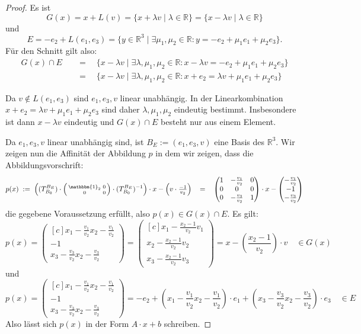 \documentclass{article}
\newcommand{\RR}{\mathbb{R}}
\newcommand{\eq}{\mathbb{\quad = \quad}}
\newcommand{\vect}[1]{\begin{pmatrix*}[c] #1 \end{pmatrix*}}
\begin{document}
\begin{proof}
  Es ist $$G(x) = x + L(v) = \{ x + \lambda v  \;|\;  \lambda \in \RR \}= \{ x - \lambda v  \;|\;  \lambda \in \RR \}$$
  und $$E = -e_2 + L(e_1, e_3) = \{y \in \RR^3  \;|\; \exists\mu_1, \mu_2 \in \RR: y = -e_2 + \mu_1 e_1 + \mu_2 e_3\}.$$
  Für den Schnitt gilt also:
\begin{align*}
    G(x) \cap E
    &\eq \{x - \lambda v  \;|\; \exists \lambda, \mu_1, \mu_2 \in \RR: x - \lambda v = -e_2 + \mu_1 e_1 + \mu_2 e_3\} \\
    &\eq \{x - \lambda v  \;|\; \exists \lambda, \mu_1, \mu_2 \in \RR: x + e_2 = \lambda v + \mu_1 e_1 + \mu_2 e_3\}
\end{align*}

Da $v \notin L(e_1,e_3)$ sind $e_1, e_3, v$ linear unabhängig.
In der Linearkombination $x + e_2 = \lambda v + \mu_1 e_1 + \mu_2 e_3$
sind daher $\lambda, \mu_1, \mu_2$ eindeutig bestimmt.
Insbesondere ist dann $x - \lambda v$ eindeutig und
$G(x) \cap E$ besteht nur aus einem Element.

\bigbreak
Da $e_1, e_3, v$ linear unabhängig sind, ist $B_E := (e_1, e_3, v)$
eine Basis des $\RR^3$.
Wir zeigen nun die Affinität der Abbildung $p$ in dem wir zeigen,
dass die Abbildungsvorschrift:
\[
p(x) \;:=\; \left((T^{B_E}_{B_0}) \cdot
\begin{psmallmatrix*}[c]
  \mathbbm{1}_2 & 0 \\ 0 & 0
\end{psmallmatrix*}
\cdot (T^{B_E}_{B_0})^{-1}\right) \cdot x - \left(v\cdot \tfrac{-1}{v_2}\right)
\eq \begin{pmatrix*}
  1 & -\frac{v_1}{v_2} & 0 \\
  0 & 0 & 0 \\
  0 & -\frac{v_3}{v_2} & 1
\end{pmatrix*}
\cdot x - \vect{ -\frac{v_1}{v_2} \\ -1 \\ -\frac{v_3}{v_2}}
\]
die gegebene Voraussetzung erfüllt, also $p(x) \in G(x) \cap E$.
Es gilt:
\[
p(x) = \vect{x_1 - \frac{v_1}{v_2}x_2 -\frac{v_1}{v_2}\\  -1  \\  x_3-\frac{v_3}{v_2} x_2-\frac{v_3}{v_2}} =
\vect{x_1 - \frac{x_2-1}{v_2} v_1\\  x_2 - \frac{x_2-1}{v_2} v_2  \\  x_3 - \frac{x_2-1}{v_2} v_3} =
x - \left(\frac{x_2-1}{v_2}\right) \cdot v \quad\in G(x)
\]
und
\[
p(x) = \vect{x_1 - \frac{v_1}{v_2}x_2 -\frac{v_1}{v_2}\\  -1  \\  x_3-\frac{v_3}{v_2} x_2-\frac{v_3}{v_2}} =
-e_2 + \left(x_1 - \frac{v_1}{v_2}x_2 -\frac{v_1}{v_2}\right) \cdot e_1 + \left(x_3-\frac{v_3}{v_2} x_2-\frac{v_3}{v_2}\right) \cdot e_3
\quad\in E
\]
Also lässt sich $p(x)$ in der Form $A \cdot x + b$ schreiben.
\end{proof}
\end{document}
